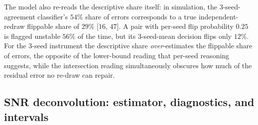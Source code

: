 The model also re-reads the descriptive share itself: in simulation, the 3-seed-agreement
classifier's $54\%$ share of errors corresponds to a true independent-redraw flippable share of
$29\%$ [$16$, $47$]. A pair with per-seed flip probability $0.25$ is flagged unstable $56\%$ of the
time, but its 3-seed-mean decision flips only $12\%$. For the 3-seed instrument the descriptive
share \emph{over}-estimates the flippable share of errors, the opposite of the lower-bound reading
that per-seed reasoning suggests, while the intersection reading simultaneously obscures how much
of the residual error no re-draw can repair.

\subsection{SNR deconvolution: estimator, diagnostics, and intervals}
\label{app:t3-snr-ci}

